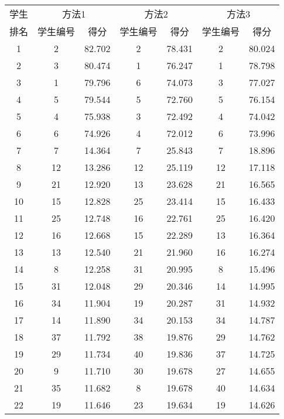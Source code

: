 \documentclass{ctexart}
\begin{document}
\newpage
\begin{center}
\begin{table}[H]\scriptsize
\begin{tabular}{|c|c|c|c|c|c|c|}
\hline
学生 & \multicolumn{2}{|c|}{方法1}& \multicolumn{2}{|c|}{方法2} & \multicolumn{2}{|c|}{方法3} \\
\cline{2-7}
排名&	学生编号&	得分	&学生编号	&得分	&学生编号&	得分\\
\hline
  1 	& 2 	& 82.702 	& 2 	& 78.431 	& 2 	& 80.024\\\hline
 2 	& 3 	& 80.474 	& 1 	& 76.247 	& 1 	& 78.798\\\hline
 3 	& 1 	& 79.796 	& 6 	& 74.073 	& 3 	& 77.027\\\hline
 4 	& 5 	& 79.544 	& 5 	& 72.760 	& 5 	& 76.154\\\hline
 5 	& 4 	& 75.938 	& 3 	& 72.492 	& 4 	& 74.042\\\hline
 6 	& 6 	& 74.926 	& 4 	& 72.012 	& 6 	& 73.996\\\hline
 7 	& 7 	& 14.364 	& 7 	& 25.843 	& 7 	& 18.896\\\hline
 8 	& 12 	& 13.286 	& 12 	& 25.119 	& 12 	& 17.118\\\hline
 9 	& 21 	& 12.920 	& 13 	& 23.628 	& 21 	& 16.565\\\hline
 10 	& 15 	& 12.828 	& 25 	& 23.414 	& 15 	& 16.433\\\hline
 11 	& 25 	& 12.748 	& 16 	& 22.761 	& 25 	& 16.420\\\hline
 12 	& 16 	& 12.668 	& 15 	& 22.289 	& 13 	& 16.364\\\hline
 13 	& 13 	& 12.540 	& 21 	& 21.960 	& 16 	& 16.274\\\hline
 14 	& 8 	& 12.258 	& 31 	& 20.995 	& 8 	& 15.496\\\hline
 15 	& 31 	& 12.048 	& 29 	& 20.346 	& 14 	& 14.995\\\hline
 16 	& 34 	& 11.904 	& 19 	& 20.287 	& 31 	& 14.932\\\hline
 17 	& 14 	& 11.890 	& 34 	& 20.153 	& 34 	& 14.787\\\hline
 18 	& 37 	& 11.792 	& 38 	& 19.876 	& 29 	& 14.762\\\hline
 19 	& 29 	& 11.734 	& 40 	& 19.836 	& 37 	& 14.725\\\hline
 20 	& 9 	& 11.710 	& 30 	& 19.678 	& 27 	& 14.655\\\hline
 21 	& 35 	& 11.682 	& 8 	& 19.678 	& 40 	& 14.634\\\hline
 22 	& 19 	& 11.646 	& 23 	& 19.634 	& 19 	& 14.626\\\hline

\end{tabular}
\end{table}
\end{center}
\end{document}
